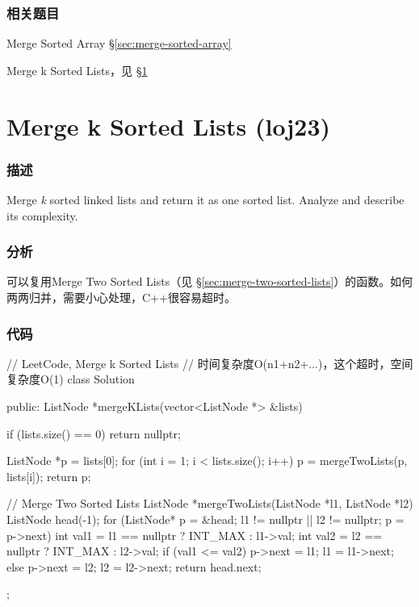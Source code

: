 \subsubsection{相关题目}
\begindot
\item Merge Sorted Array \S \ref{sec:merge-sorted-array}
\item Merge k Sorted Lists，见 \S \ref{sec:merge-k-sorted-lists}
\myenddot


\section{Merge k Sorted Lists (loj23)} %
\label{sec:merge-k-sorted-lists}


\subsubsection{描述}
Merge \textit{k} sorted linked lists and return it as one sorted list. Analyze and describe its complexity.


\subsubsection{分析}
可以复用Merge Two Sorted Lists（见 \S \ref{sec:merge-two-sorted-lists}）的函数。如何两两归并，需要小心处理，C++很容易超时。


\subsubsection{代码}
\begin{Code}
// LeetCode, Merge k Sorted Lists
// 时间复杂度O(n1+n2+...)，这个超时，空间复杂度O(1)
class Solution {
public:
    ListNode *mergeKLists(vector<ListNode *> &lists) {
        if (lists.size() == 0) return nullptr;

        ListNode *p = lists[0];
        for (int i = 1; i < lists.size(); i++) {
            p = mergeTwoLists(p, lists[i]);
        }
        return p;
    }

    // Merge Two Sorted Lists
    ListNode *mergeTwoLists(ListNode *l1, ListNode *l2) {
        ListNode head(-1);
        for (ListNode* p = &head; l1 != nullptr || l2 != nullptr; p = p->next) {
            int val1 = l1 == nullptr ? INT_MAX : l1->val;
            int val2 = l2 == nullptr ? INT_MAX : l2->val;
            if (val1 <= val2) {
                p->next = l1;
                l1 = l1->next;
            } else {
                p->next = l2;
                l2 = l2->next;
            }
        }
        return head.next;
    }
};
\end{Code}

